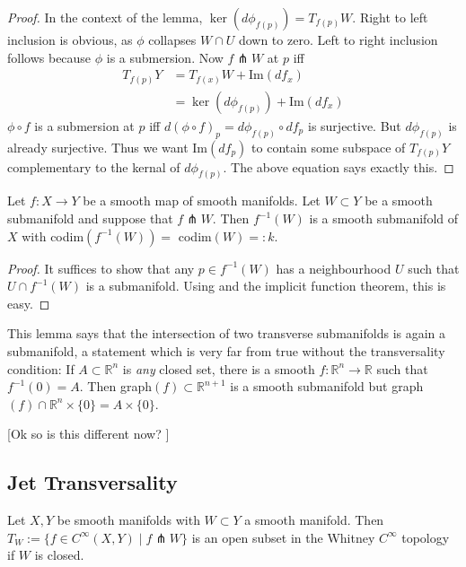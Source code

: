 \documentclass[12pt]{article}
\newcommand{\RR}{\mathbb{R}}
\begin{document}
\begin{proof}
    In the context of the lemma, $\ker (d\phi_{f(p)}) = T_{f(p)} W$. Right to left inclusion is obvious, as $\phi$ collapses $W \cap U$ down to zero. Left to right inclusion follows because $\phi$ is a submersion. Now $f\pitchfork W$ at $p$ iff
    \begin{align*}
        T_{f(p)} Y & = T_{f(x)} W + \text{Im} (df_x) \\
        & = \ker(d\phi_{f(p)}) + \text{Im}(df_x) 
    \end{align*}
    $\phi \circ f$ is a submersion at $p$ iff $d(\phi\circ f)_p = d\phi_{f(p)} \circ df_p$ is surjective. But $d\phi_{f(p)}$ is already surjective. Thus we want Im$(df_p)$ to contain some subspace of $T_{f(p)} Y$ complementary to the kernal of $d\phi_{f(p)}$. The above equation says exactly this. 
\end{proof}

\begin{lemma} \label{implicit transverse theorem}
    Let $f: X \to Y$ be a smooth map of smooth manifolds. Let $W \subset Y$ be a smooth submanifold and suppose that $f\pitchfork W$. Then $f^{-1}(W)$ is a smooth submanifold of $X$ with codim$(f^{-1}(W)) =$ codim$(W) =: k$. 
\end{lemma}

\begin{proof}
    It suffices to show that any $p \in f^{-1}(W)$ has a neighbourhood $U$ such that $U \cap f^{-1}(W)$ is a submanifold. Using  and the implicit function theorem, this is easy.
\end{proof}

This lemma says that the intersection of two transverse submanifolds is again a submanifold, a statement which is very far from true without the transversality condition: If $A \subset \RR^{n}$ is \emph{any} closed set, there is a smooth $f: \RR^n \to \RR$ such that $f^{-1}(0) = A$. Then graph$(f) \subset \RR^{n+1}$ is a smooth submanifold but graph$(f) \cap \RR^n \times \{ 0\} = A \times\{0\}$. 


[Ok so is this different now? ]

\subsection{Jet Transversality}

\begin{lemma} \label{open if W closed}
    Let $X, Y$ be smooth manifolds with $W \subset Y$ a smooth manifold. Then $T_W := \{f\in C^\infty(X, Y)\mid f \pitchfork W \}$ is an open subset in the Whitney $C^\infty$ topology if $W$ is closed. 
\end{lemma}
\end{document}
